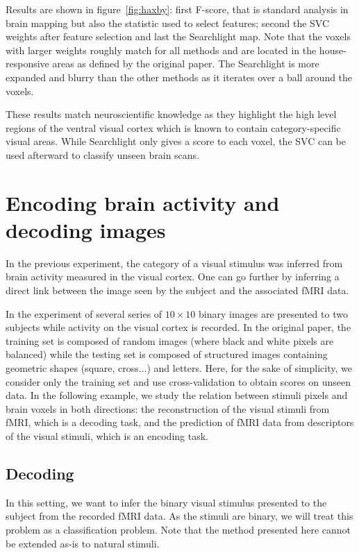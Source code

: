 \documentclass{frontiersSCNS} %
\begin{document}
Results are shown in figure~\ref{fig:haxby}: first
F-score, that is standard analysis in brain mapping but also the
statistic used to select features; second the SVC weights after feature
selection and last the Searchlight map.
%
Note that the voxels with larger weights roughly match for all methods and
are located in the house-responsive areas as defined by the original paper.
%
The Searchlight is more expanded and blurry than the other methods
as it iterates over a ball around the voxels.

These results match neuroscientific knowledge as they highlight the
high level regions of the ventral visual cortex which is known to
contain category-specific visual areas. While Searchlight only gives a
score to each voxel, the SVC can be used afterward to classify unseen
brain scans.

\section{Encoding brain activity and decoding images}
\label{kamitani}

In the previous experiment, the category of a visual stimulus was inferred from
brain activity measured in the visual cortex.
One can go further by inferring a direct link between the image
seen by the subject and the associated fMRI data.

In the experiment of \cite{miyawaki2008} several series of $10{\times}10$
binary images are presented to two subjects while activity on the visual cortex
is recorded.
In the original paper, the training set is composed of random images (where black and white pixels
are balanced) while the testing set is composed of structured images containing
geometric shapes (square, cross...) and letters. Here, for the sake of simplicity, we consider only the training set and use cross-validation to
obtain scores on unseen data.
%
In the following example, we study the relation between stimuli pixels and
brain voxels in both directions: the reconstruction of the visual stimuli
from fMRI, which is a decoding task, and the prediction of fMRI data
from descriptors of the visual stimuli, which is an encoding task.

\subsection{Decoding}

In this setting, we want to infer the binary visual stimulus presented to
the subject from the recorded fMRI data.
As the stimuli are binary, we will treat this problem as a classification
problem. Note that the method presented here cannot be extended as-is to
natural stimuli. 
\end{document}
